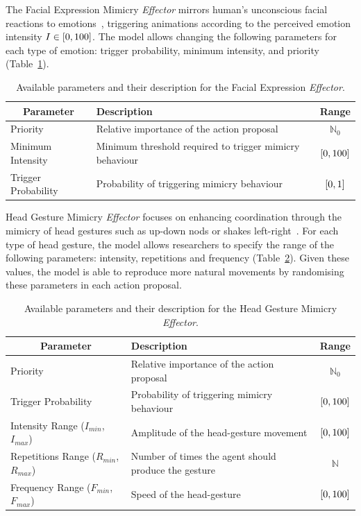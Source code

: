 The Facial Expression Mimicry \textit{Effector} mirrors human's unconscious facial reactions to emotions~\cite{Dimberg2000}, triggering animations according to the perceived emotion intensity $I \in \interval{0}{100}$. The model allows changing the following parameters for each type of emotion: trigger probability, minimum intensity, and priority (Table~\ref{table:facialMimicryParameters}).


\begin{table}[H]
	\centering
	\begin{tabular}{|l|l|c|}
	\hline
	\multicolumn{1}{|c|}{\textbf{Parameter}} & \textbf{Description} & \textbf{Range} \\ \hline
		Priority & Relative importance of the action proposal & $\mathbb{N}_0$ \\ \hline
		Minimum Intensity & Minimum threshold required to trigger mimicry behaviour & $\interval{0}{100}$\\ \hline
		Trigger Probability & Probability of triggering mimicry behaviour & $\interval{0}{1}$ \\ \hline
	\end{tabular}
	\caption{Available parameters and their description for the Facial Expression \textit{Effector}.}
	\label{table:facialMimicryParameters}
\end{table}

Head Gesture Mimicry \textit{Effector} focuses on enhancing coordination through the mimicry of head gestures such as up-down nods or shakes left-right~\cite{Riek2009, Andrist2014, Cassell2007, Wang2009}. For each type of head gesture, the model allows researchers to specify the range of the following parameters: intensity, repetitions and frequency (Table~\ref{table:headNodMimicryParameters}). Given these values, the model is able to reproduce more natural movements by randomising these parameters in each action proposal.

\begin{table}[H]
	\centering
	\begin{tabular}{|l|l|c|}
	\hline
	\multicolumn{1}{|c|}{\textbf{Parameter}} & \textbf{Description} & \textbf{Range} \\ \hline
		Priority & Relative importance of the action proposal & $\mathbb{N}_0$ \\ \hline
		Trigger Probability & Probability of triggering mimicry behaviour & $\interval{0}{100}$ \\ \hline
		Intensity Range ($I_{min}$, $I_{max}$) & Amplitude of the head-gesture movement & $\interval{0}{100}$ \\ \hline
		Repetitions Range ($R_{min}$, $R_{max}$) & Number of times the agent should produce the gesture & $\mathbb{N}$\\ \hline
		Frequency Range ($F_{min}$, $F_{max}$) & Speed of the head-gesture & $\interval{0}{100}$ \\ \hline				
	\end{tabular}
	\caption{Available parameters and their description for the Head Gesture Mimicry \textit{Effector}.}
	\label{table:headNodMimicryParameters}
\end{table}

